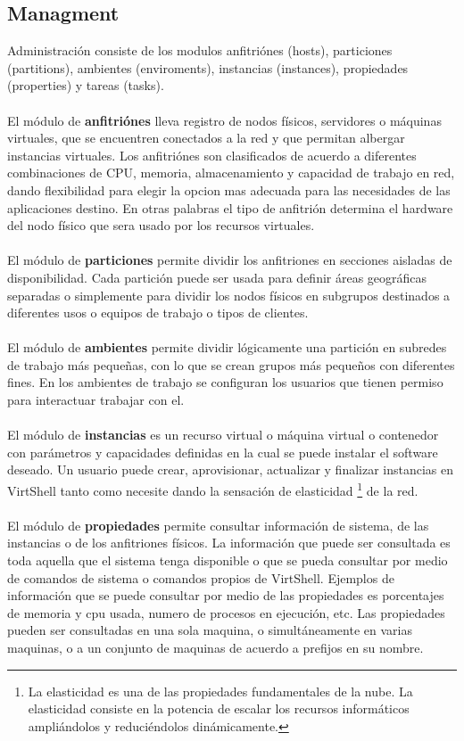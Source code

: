 \subsection{Managment}
Administración consiste de los modulos anfitriónes (hosts), particiones (partitions), ambientes (enviroments), instancias (instances), propiedades (properties) y tareas (tasks). \\
\\
El módulo de \textbf{anfitriónes} lleva registro de nodos físicos, servidores o máquinas virtuales, que se encuentren conectados a la red y que permitan albergar instancias virtuales. Los anfitriónes son clasificados de acuerdo a diferentes combinaciones de CPU, memoria, almacenamiento y capacidad de trabajo en red, dando flexibilidad para elegir la opcion mas adecuada para las necesidades de las aplicaciones destino. En otras palabras el tipo de anfitrión determina el hardware del nodo físico que sera usado por los recursos virtuales.\\
\\
El módulo de \textbf{particiones} permite dividir los anfitriones en secciones aisladas de disponibilidad. Cada partición puede ser usada para definir áreas geográficas separadas o simplemente para dividir los nodos físicos en subgrupos destinados a diferentes usos o equipos de trabajo o tipos de clientes.\\
\\
El módulo de \textbf{ambientes} permite dividir lógicamente una partición en subredes de trabajo más pequeñas, con lo que se crean grupos más pequeños con diferentes fines. En los ambientes de trabajo se configuran los usuarios que tienen permiso para interactuar trabajar con el.\\
\\
El módulo de \textbf{instancias} es un recurso virtual o máquina virtual o contenedor con parámetros y capacidades definidas en la cual se puede instalar el software deseado. Un usuario puede crear, aprovisionar, actualizar y finalizar instancias en VirtShell tanto como necesite dando la sensación de elasticidad \footnote{La elasticidad es una de las propiedades fundamentales de la nube. La elasticidad consiste en la potencia de escalar los recursos informáticos ampliándolos y reduciéndolos dinámicamente.} de la red.\\
\\
El módulo de \textbf{propiedades} permite consultar información de sistema, de las instancias o de los anfitriones físicos. La información que puede ser consultada es toda aquella que el sistema tenga disponible o que se pueda consultar por medio de comandos de sistema o comandos propios de VirtShell. Ejemplos de información que se puede consultar por medio de las propiedades es porcentajes de memoria y cpu usada, numero de procesos en ejecución, etc. Las propiedades pueden ser consultadas en una sola maquina, o simultáneamente en varias maquinas, o a un conjunto de maquinas de acuerdo a prefijos en su nombre.\\
